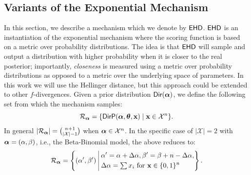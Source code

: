 \documentclass{article}
\begin{document}
\subsection{Variants of the Exponential Mechanism}
\label{sec_exp}
In this section, we describe a mechanism which we denote by $\mathsf{EHD}$. $\mathsf{EHD}$ is an instantiation
of the exponential mechanism \cite{talwar} where the scoring function is based on a metric over
probability distributions.
The idea is that $\mathsf{EHD}$ will sample and output a distribution with higher probability when
it is closer to the real posterior; importantly,  \emph{closeness} is measured using a metric over probability
distributions as opposed to a metric over the underlying space of parameters. In this work we will
use the Hellinger distance, but this approach could be extended to other $f$-divergences. 
Given a prior distribution $\mathsf{Dir}(\boldsymbol{\alpha})$,
we define the following set from which the mechanism samples:
\[
  \mathcal{R}_{\boldsymbol{\alpha}}=\{\mathsf{DirP}(\boldsymbol{\alpha},\boldsymbol{\theta},\textbf{x})\mid \textbf{x} \in \mathcal{X}^n\}.
\]
In general $|\mathcal{R}_{\boldsymbol{\alpha}}|=\binom{n + 1}{|\mathcal{X}| - 1}$ when $\boldsymbol{\alpha}\in\mathcal{X}^n$. In the specific case of $|\mathcal{X}|=2$ with $\boldsymbol{\alpha}=(\alpha,\beta)$,
i.e., the Beta-Binomial model, the above reduces to:
\[
\candidateset{\valpha}=  \left \{(\alpha',\beta') ~\vline~ \begin{aligned} & \alpha'=\alpha + \Delta\alpha, \beta'=\beta + n-\Delta\alpha, \\ & \Delta\alpha={\textstyle \sum x_i} \text{ for } \dataobs\in \{0,1\}^n \end{aligned} \right\}.
\]
\end{document}
